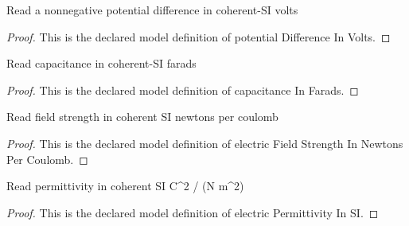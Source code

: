 \begin{definition}
  \label{def:physics:phyx-mini-0908:phyxminiproblems-problemphyxmini0908-potentialdifferenceinvolts}
  Read a nonnegative potential difference in coherent-SI volts
\end{definition}
\begin{proof}
  This is the declared model definition of potential Difference In Volts.
\end{proof}
\begin{definition}
  \label{def:physics:phyx-mini-0908:phyxminiproblems-problemphyxmini0908-capacitanceinfarads}
  Read capacitance in coherent-SI farads
\end{definition}
\begin{proof}
  This is the declared model definition of capacitance In Farads.
\end{proof}
\begin{definition}
  \label{def:physics:phyx-mini-0908:phyxminiproblems-problemphyxmini0908-electricfieldstrengthinnewtonspercoulomb}
  Read field strength in coherent SI newtons per coulomb
\end{definition}
\begin{proof}
  This is the declared model definition of electric Field Strength In Newtons Per Coulomb.
\end{proof}
\begin{definition}
  \label{def:physics:phyx-mini-0908:phyxminiproblems-problemphyxmini0908-electricpermittivityinsi}
  Read permittivity in coherent SI C\textasciicircum{}2 / (N m\textasciicircum{}2)
\end{definition}
\begin{proof}
  This is the declared model definition of electric Permittivity In SI.
\end{proof}
